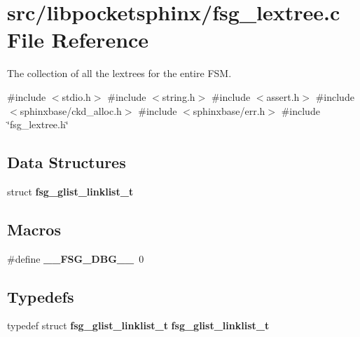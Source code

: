 \section{src/libpocketsphinx/fsg\+\_\+lextree.c File Reference}
\label{fsg__lextree_8c}


The collection of all the lextrees for the entire F\+SM.  


{\ttfamily \#include $<$stdio.\+h$>$}\newline
{\ttfamily \#include $<$string.\+h$>$}\newline
{\ttfamily \#include $<$assert.\+h$>$}\newline
{\ttfamily \#include $<$sphinxbase/ckd\+\_\+alloc.\+h$>$}\newline
{\ttfamily \#include $<$sphinxbase/err.\+h$>$}\newline
{\ttfamily \#include \char`\"{}fsg\+\_\+lextree.\+h\char`\"{}}\newline
\subsection*{Data Structures}
\begin{DoxyCompactItemize}
\item 
struct \textbf{ fsg\+\_\+glist\+\_\+linklist\+\_\+t}
\end{DoxyCompactItemize}
\subsection*{Macros}
\begin{DoxyCompactItemize}
\item 
\mbox{\label{fsg__lextree_8c_a7acaaaaea00ab148fa241f7ce86cab14}} 
\#define {\bfseries \+\_\+\+\_\+\+F\+S\+G\+\_\+\+D\+B\+G\+\_\+\+\_\+}~0
\end{DoxyCompactItemize}
\subsection*{Typedefs}
\begin{DoxyCompactItemize}
\item 
\mbox{\label{fsg__lextree_8c_a0ed5b76987ef1e416b40a06a9d80902f}} 
typedef struct \textbf{ fsg\+\_\+glist\+\_\+linklist\+\_\+t} {\bfseries fsg\+\_\+glist\+\_\+linklist\+\_\+t}
\end{DoxyCompactItemize}
